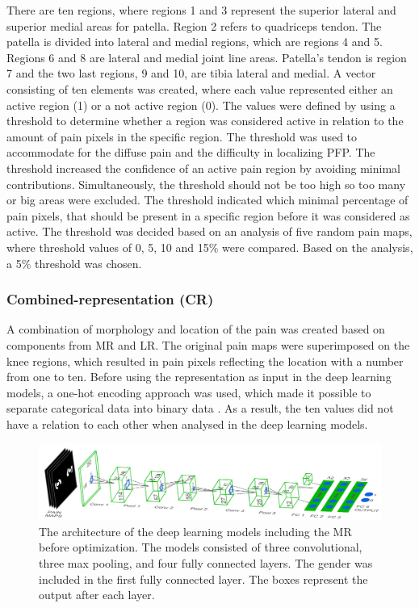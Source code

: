 \noindent 
There are ten regions, where regions 1 and 3 represent the superior lateral and superior medial areas for patella. Region 2 refers to quadriceps tendon. The patella is divided into lateral and medial regions, which are regions 4 and 5. Regions 6 and 8 are lateral and medial joint line areas. Patella's tendon is region 7 and the two last regions, 9 and 10, are tibia lateral and medial.\citep{Elson2010} \newline
\noindent
A vector consisting of ten elements was created, where each value represented either an active region (1) or a not active region (0). The values were defined by using a threshold to determine whether a region was considered active in relation to the amount of pain pixels in the specific region. The threshold was used to accommodate for the diffuse pain and the difficulty in localizing PFP. The threshold increased the confidence of an active pain region by avoiding minimal contributions. Simultaneously, the threshold should not be too high so too many or big areas were excluded. The threshold indicated which minimal percentage of pain pixels, that should be present in a specific region before it was considered as active. The threshold was decided based on an analysis of five random pain maps, where threshold values of 0, 5, 10 and 15\% were compared. Based on the analysis, a 5\% threshold was chosen.  

\subsubsection{Combined-representation (CR)}
A combination of morphology and location of the pain was created based on components from MR and LR. The original pain maps were superimposed on the knee regions, which resulted in pain pixels reflecting the location with a number from one to ten. Before using the representation as input in the deep learning models, a one-hot encoding approach was used, which made it possible to separate categorical data into binary data \citep{Harris2012}. As a result, the ten values did not have a relation to each other when analysed in the deep learning models. 


\begin{figure} [t!]
\centering
\includegraphics[width=1\textwidth]{Figures/models}
\caption{The architecture of the deep learning models including the MR before optimization. The models consisted of three convolutional, three max pooling, and four fully connected layers. The gender was included in the first fully connected layer. The boxes represent the output after each layer.}
\label{fig:models}
\end{figure}

